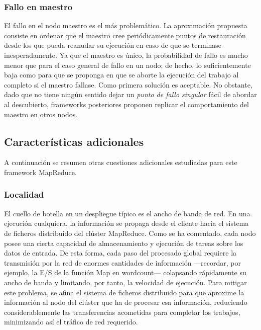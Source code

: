 \subsubsection{Fallo en maestro}\label{subsubsec:fallomaestro}
\noindent El fallo en el nodo maestro es el m\'as problem\'atico. La aproximaci\'on propuesta consiste en ordenar que el maestro cree peri\'odicamente puntos de restauraci\'on desde los que pueda reanudar su ejecuci\'on en caso de que se terminase inesperadamente. Ya que el maestro es \'unico, la probabilidad de fallo es mucho menor que para el caso general de fallo en un nodo; de hecho, lo suficientemente baja como para que se proponga en \cite{googlemapreduce} que se aborte la ejecuci\'on del trabajo al completo si el maestro fallase. Como primera soluci\'on es acep\-ta\-ble. No obstante, dado que no tiene ning\'un sentido dejar un \emph{punto de fallo singular} f\'acil de abordar al descubierto, frameworks posteriores proponen replicar el comportamiento del maestro en otros nodos.


\subsection{Caracter\'isticas adicionales}\label{subsec:caracteristicasadicionales}
\noindent A continuaci\'on se resumen otras cuestiones adicionales estudiadas para este framework MapReduce.

\subsubsection{Localidad}\label{subsubsec:localidad}
\noindent El cuello de botella en un despliegue t\'ipico es el ancho de banda de red. En una ejecuci\'on cualquiera, la informaci\'on se propaga desde el cliente hacia el sistema de ficheros distribuido del cl\'uster MapReduce. Como se ha comentado, cada nodo posee una cierta capacidad de almacenamiento y ejecuci\'on de tareas sobre los datos de entrada. De esta forma, cada paso del procesado global requiere la transmisi\'on por la red de enormes cantidades de informaci\'on ---recordar, por ejemplo, la E/S de la funci\'on Map en wordcount--- colapsando r\'apidamente su ancho de banda y limitando, por tanto, la velocidad de ejecuci\'on. Para mitigar este problema, se afina el sistema de ficheros distribuido para que aproxime la informaci\'on al nodo del cl\'uster que ha de procesar esa informaci\'on, reduciendo considerablemente las transferencias acometidas para completar los trabajos, minimizando as\'i el tr\'afico de red requerido.


